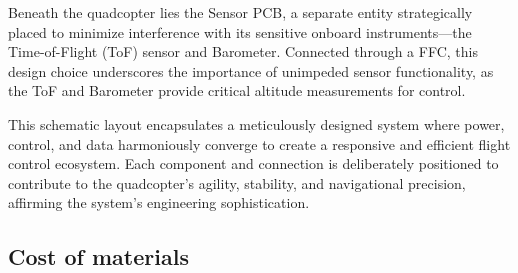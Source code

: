 \documentclass{article}
\begin{document}
Beneath the quadcopter lies the Sensor PCB, a separate entity strategically placed to minimize interference with its sensitive onboard instruments—the Time-of-Flight (ToF) sensor and Barometer. Connected through a FFC, this design choice underscores the importance of unimpeded sensor functionality, as the ToF and Barometer provide critical altitude measurements for control.

This schematic layout encapsulates a meticulously designed system where power, control, and data harmoniously converge to create a responsive and efficient flight control ecosystem. Each component and connection is deliberately positioned to contribute to the quadcopter's agility, stability, and navigational precision, affirming the system's engineering sophistication.

\subsection{Cost of materials}
\end{document}
